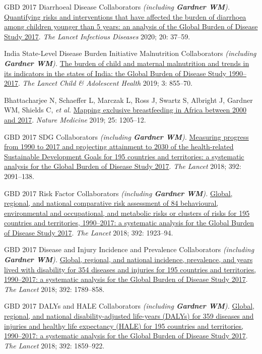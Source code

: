 \documentclass[11pt,article,oneside]{memoir}
\begin{document}
\newpage

\ind GBD 2017 Diarrhoeal Disease Collaborators \emph{(including \textbf{Gardner WM}).} \href{https://doi.org/10.1016/S1473-3099(19)30401-3}{Quantifying risks and interventions that have
affected the burden of diarrhoea among children younger than 5 years: an analysis of the Global Burden of
Disease Study 2017}. \emph{The Lancet Infectious Diseases} 2020; 20: 37--59.

\ind India State-Level Disease Burden Initiative Malnutrition Collaborators \emph{(including \textbf{Gardner WM}).} \href{https://doi.org/10.1016/S2352-4642(19)30273-1}{The burden
of child and maternal malnutrition and trends in its indicators in the states of India: the Global Burden of
Disease Study 1990--2017}. \emph{The Lancet Child \& Adolescent Health} 2019; 3: 855--70.

\ind Bhattacharjee N, Schaeffer L, Marczak L, Ross J, Swartz S, Albright J, {\minbold Gardner WM}, Shields C, \emph{et al.} 
\href{https://doi.org/10.1038/s41591-019-0525-0}{Mapping exclusive breastfeeding in Africa between 2000 and 2017}. \emph{Nature Medicine} 2019; 25: 1205--12.

\ind GBD 2017 SDG Collaborators \emph{(including \textbf{Gardner WM}).} \href{https://doi.org/10.1016/S0140-6736(18)32281-5}{Measuring progress from 1990 to 2017 and
projecting attainment to 2030 of the health-related Sustainable Development Goals for 195 countries and
territories: a systematic analysis for the Global Burden of Disease Study 2017}. \emph{The Lancet} 2018; 392: 2091--138.

\ind GBD 2017 Risk Factor Collaborators \emph{(including \textbf{Gardner WM}).} \href{https://doi.org/10.1016/S0140-6736(18)32225-6}{Global, regional, and national comparative
risk assessment of 84 behavioural, environmental and occupational, and metabolic risks or clusters of risks
for 195 countries and territories, 1990--2017: a systematic analysis for the Global Burden of Disease Study
2017}. \emph{The Lancet} 2018; 392: 1923--94.

\ind GBD 2017 Disease and Injury Incidence and Prevalence Collaborators \emph{(including \textbf{Gardner WM}).} \href{https://doi.org/10.1016/S0140-6736(18)32279-7}{Global, regional, and national incidence,
prevalence, and years lived with disability for 354 diseases and injuries for 195 countries and territories, 1990--2017: a 
systematic analysis for the Global Burden of Disease Study 2017}. \emph{The Lancet} 2018; 392: 1789--858.

\ind GBD 2017 DALYs and HALE Collaborators \emph{(including \textbf{Gardner WM}).} \href{https://doi.org/10.1016/S0140-6736(18)32335-3}{Global, regional, and national disability-adjusted
life-years (DALYs) for 359 diseases and injuries and healthy life expectancy (HALE) for 195 countries and
territories, 1990--2017: a systematic analysis for the Global Burden of Disease Study 2017}. \emph{The Lancet} 2018; 392: 1859--922.
\end{document}
